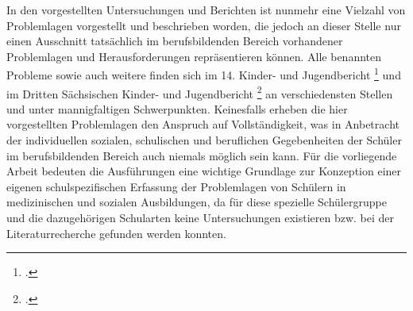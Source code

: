 In den vorgestellten Untersuchungen und Berichten ist nunmehr eine Vielzahl von Problemlagen vorgestellt und beschrieben worden, die jedoch an dieser Stelle nur einen Ausschnitt tatsächlich im berufsbildenden Bereich vorhandener Problemlagen und Herausforderungen repräsentieren können. Alle benannten Probleme sowie auch weitere finden sich im 14. Kinder- und Jugendbericht \footcite[44f]{BundesministeriumFamilie2013} und im Dritten Sächsischen Kinder- und Jugendbericht \footcite[30ff]{SMSSS2009} an verschiedensten Stellen und unter mannigfaltigen Schwerpunkten. Keinesfalls erheben die hier vorgestellten Problemlagen den Anspruch auf Vollständigkeit, was in Anbetracht der individuellen sozialen, schulischen und beruflichen Gegebenheiten der Schüler im berufsbildenden Bereich auch niemals möglich sein kann. Für die vorliegende Arbeit bedeuten die Ausführungen eine wichtige Grundlage zur Konzeption einer eigenen schulspezifischen Erfassung der Problemlagen von Schülern in medizinischen und sozialen Ausbildungen, da für diese spezielle Schülergruppe und die dazugehörigen Schularten keine Untersuchungen existieren bzw. bei der Literaturrecherche gefunden werden konnten. 
